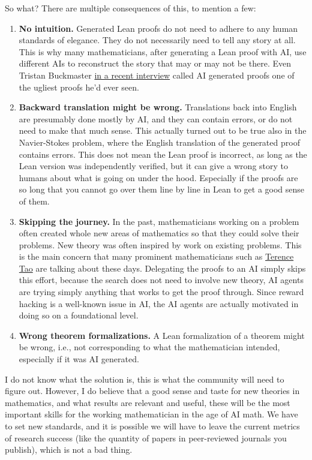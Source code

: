 \documentclass{article}
\begin{document}
So what? There are multiple consequences of this, to mention a few:
\begin{enumerate}
\item \textbf{No intuition.} Generated Lean proofs do not need to adhere to any human standards of elegance.
They do not necessarily need to tell any story at all.
This is why many mathematicians, after generating a Lean proof with AI, use different AIs to reconstruct the story that may or may not be there.
Even Tristan Buckmaster \href{https://www.youtube.com/watch?v=PQYFRuZ5phs}{in a recent interview} called AI generated proofs one of the ugliest proofs he'd ever seen.
\item \textbf{Backward translation might be wrong.} Translations back into English are presumably done mostly by AI, and they can contain errors, or do not need to make that much sense. This actually turned out to be true also in the Navier-Stokes problem, where the English translation of the generated proof contains errors. This does not mean the Lean proof is incorrect, as long as the Lean version was independently verified, but it can give a wrong story to humans about what is going on under the hood.
Especially if the proofs are so long that you cannot go over them line by line in Lean to get a good sense of them.
\item \textbf{Skipping the journey.} In the past, mathematicians working on a problem often created whole new areas of mathematics so that they could solve their problems. New theory was often inspired by work on existing problems. This is the main concern that many prominent mathematicians such as \href{https://www.youtube.com/watch?v=svl_1upFpQo}{Terence Tao} are talking about these days. Delegating the proofs to an AI simply skips this effort, because the search does not need to involve new theory, AI agents are trying simply anything that works to get the proof through. Since reward hacking is a well-known issue in AI, the AI agents are actually motivated in doing so on a foundational level.
\item \textbf{Wrong theorem formalizations.} A Lean formalization of a theorem might be wrong, i.e., not corresponding to what the mathematician intended, especially if it was AI generated.
\end{enumerate}

I do not know what the solution is, this is what the community will need to figure out.
However, I do believe that a good sense and taste for new theories in mathematics, and what results are relevant and useful, these will be the most important skills for the working mathematician in the age of AI math.
We have to set new standards, and it is possible we will have to leave the current metrics of research success (like the quantity of papers in peer-reviewed journals you publish), which is not a bad thing.
\end{document}
